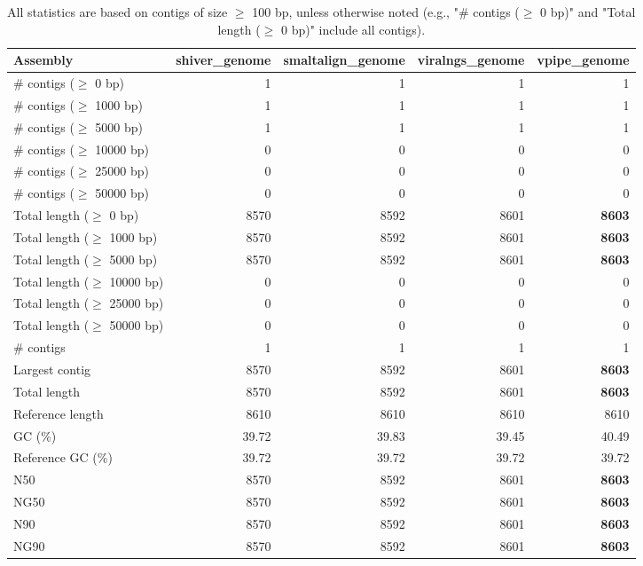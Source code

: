 \documentclass[12pt,a4paper]{article}
\begin{document}
\begin{table}[ht]
\begin{center}
\caption{All statistics are based on contigs of size $\geq$ 100 bp, unless otherwise noted (e.g., "\# contigs ($\geq$ 0 bp)" and "Total length ($\geq$ 0 bp)" include all contigs).}
\begin{tabular}{|l*{4}{|r}|}
\hline
Assembly & shiver\_genome & smaltalign\_genome & viralngs\_genome & vpipe\_genome \\ \hline
\# contigs ($\geq$ 0 bp) & 1 & 1 & 1 & 1 \\ \hline
\# contigs ($\geq$ 1000 bp) & 1 & 1 & 1 & 1 \\ \hline
\# contigs ($\geq$ 5000 bp) & 1 & 1 & 1 & 1 \\ \hline
\# contigs ($\geq$ 10000 bp) & 0 & 0 & 0 & 0 \\ \hline
\# contigs ($\geq$ 25000 bp) & 0 & 0 & 0 & 0 \\ \hline
\# contigs ($\geq$ 50000 bp) & 0 & 0 & 0 & 0 \\ \hline
Total length ($\geq$ 0 bp) & 8570 & 8592 & 8601 & {\bf 8603} \\ \hline
Total length ($\geq$ 1000 bp) & 8570 & 8592 & 8601 & {\bf 8603} \\ \hline
Total length ($\geq$ 5000 bp) & 8570 & 8592 & 8601 & {\bf 8603} \\ \hline
Total length ($\geq$ 10000 bp) & 0 & 0 & 0 & 0 \\ \hline
Total length ($\geq$ 25000 bp) & 0 & 0 & 0 & 0 \\ \hline
Total length ($\geq$ 50000 bp) & 0 & 0 & 0 & 0 \\ \hline
\# contigs & 1 & 1 & 1 & 1 \\ \hline
Largest contig & 8570 & 8592 & 8601 & {\bf 8603} \\ \hline
Total length & 8570 & 8592 & 8601 & {\bf 8603} \\ \hline
Reference length & 8610 & 8610 & 8610 & 8610 \\ \hline
GC (\%) & 39.72 & 39.83 & 39.45 & 40.49 \\ \hline
Reference GC (\%) & 39.72 & 39.72 & 39.72 & 39.72 \\ \hline
N50 & 8570 & 8592 & 8601 & {\bf 8603} \\ \hline
NG50 & 8570 & 8592 & 8601 & {\bf 8603} \\ \hline
N90 & 8570 & 8592 & 8601 & {\bf 8603} \\ \hline
NG90 & 8570 & 8592 & 8601 & {\bf 8603} \\ \hline

\end{tabular}
\end{center}
\end{table}
\end{document}
